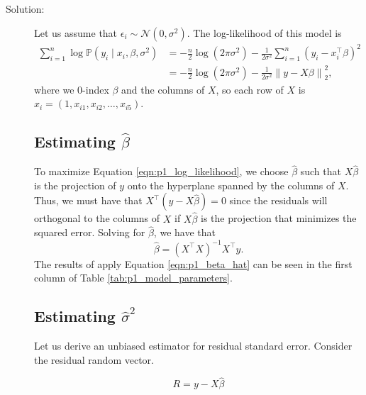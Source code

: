 \documentclass[letterpaper,11pt]{article}
\begin{document}
\begin{enumerate}
\begin{enumerate}
    \begin{description}
    \item[Solution:] Let us assume that
      $\epsilon_i \sim \mathcal{N}\left(0, \sigma^2\right)$. The log-likelihood
      of this model is
      \begin{align}
        \sum_{i=1}^n \log\mathbb{P}\left(y_i \mid x_i, \beta, \sigma^2\right)
        &= -\frac{n}{2}\log\left(2\pi\sigma^2\right)
          - \frac{1}{2\sigma^2}\sum_{i=1}^n \left(y_i - x_i^\intercal\beta\right)^2
          \nonumber \\
        &= -\frac{n}{2}\log\left(2\pi\sigma^2\right) - \frac{1}{2\sigma^2}\left\lVert
          y - X\beta
          \right\rVert_2^2,
          \label{eqn:p1_log_likelihood}
      \end{align}
      where we $0$-index $\beta$ and the columns of $X$, so each row of $X$ is
      $x_i = \left(1, x_{i1}, x_{i2},\ldots,x_{i5}\right)$.

      \subsection*{Estimating $\hat{\beta}$}

      To maximize Equation \ref{eqn:p1_log_likelihood}, we choose $\hat{\beta}$
      such that $X\hat{\beta}$ is the projection of $y$ onto the hyperplane
      spanned by the columns of $X$. Thus, we must have that
      $X^\intercal\left(y - X\hat{\beta}\right) = 0$ since the residuals will
      orthogonal to the columns of $X$ if $X\hat{\beta}$ is the projection that
      minimizes the squared error. Solving for $\hat{\beta}$, we have that
      \begin{equation}
        \hat{\beta} = \left(X^\intercal X\right)^{-1} X^\intercal y.
        \label{eqn:p1_beta_hat}
      \end{equation}
      The results of apply Equation \ref{eqn:p1_beta_hat} can be seen in the
      first column of Table \ref{tab:p1_model_parameters}.

      \subsection*{Estimating $\hat{\sigma}^2$}

      Let us derive an unbiased estimator for residual standard error. Consider
      the residual random vector.

      \begin{equation}
        R = y - X\hat{\beta}
      \end{equation}


\end{description}
\end{enumerate}
\end{enumerate}
\end{document}
